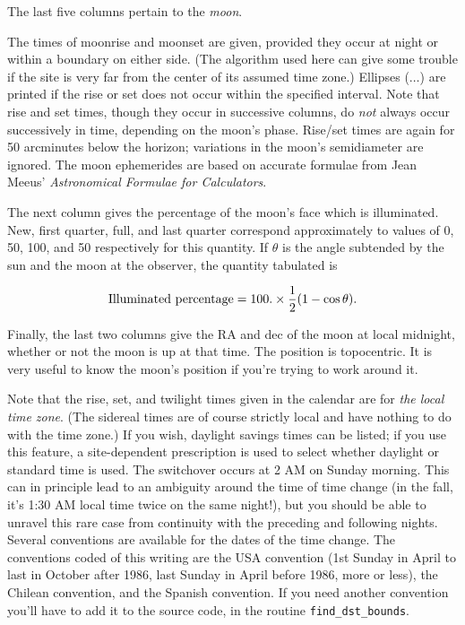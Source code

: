 The last five columns pertain to the {\it moon}.  

The times of moonrise and moonset are given, provided they 
occur at night or within a boundary on either side.  (The algorithm
used here can give some trouble if the site is very far from the
center of its assumed time zone.)
Ellipses ($\ldots$) are printed if
the rise or set does not occur within the specified interval.  Note
that rise and set times, though they occur in successive columns,
do {\it not} always occur successively in time, depending on the moon's
phase.  Rise/set times are again for 50 arcminutes below the horizon;
variations in the moon's semidiameter are ignored.  The moon ephemerides 
are based on accurate formulae from Jean Meeus' {\it Astronomical
Formulae for Calculators}.

The next column gives the percentage of the moon's face which is
illuminated.  New, first quarter, full, and last quarter
correspond approximately to values of 0, 50, 100, and 50
respectively for this quantity.  If $\theta$ is the angle subtended by
the sun and the moon at the observer, the quantity tabulated is

$$\hbox{Illuminated percentage} = 100. \times {1 \over 2}(1 - \cos \theta ).$$

Finally, the last two columns give the RA and dec of the moon at local
midnight, whether or not the moon is up at that time.  The position
is topocentric.  It is very useful to know the moon's position 
if you're trying to work around it.


Note that the rise, set, and twilight times given in the calendar 
are for {\it the local time zone}.  (The sidereal times are of course 
strictly local and have nothing to do with the time zone.)  If 
you wish, daylight savings times can be listed; if you use
this feature, a site-dependent prescription is used to select
whether daylight or standard time is used.  The
switchover occurs at 2 AM on Sunday morning.  This can in principle
lead to an ambiguity around the time of time change (in the fall,
it's 1:30 AM local time twice on the same night!), but you should
be able to unravel this rare case from continuity with the
preceding and following nights.  Several conventions are
available for the dates of the time change.
The conventions coded of this writing are the USA convention (1st
Sunday in April to last in October after 1986, last Sunday in April
before 1986, more or less), the Chilean convention, and the 
Spanish convention.  If you need another convention you'll have to
add it to the source code, in the routine {\tt find\_dst\_bounds}.

